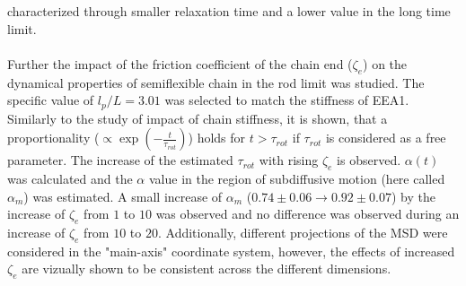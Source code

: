 \documentclass[
    paper=A4,pagesize=automedia,fontsize=12pt,
    BCOR=15mm,DIV=22,
    twoside,headinclude,footinclude=false,
    fleqn,             %
    bibliography=totocnumbered,          %
    listof=totoc,                %
    listof=flat,                 %
    cleardoublepage=empty      %
    numbers=endperiod
]{scrartcl}
\begin{document}
characterized through smaller relaxation time and a lower value in the long time limit.
\\
\\
Further the impact of the friction coefficient of the chain end ($\zeta_e$) 
on the dynamical properties of semiflexible chain in the rod limit was studied.
The specific value of $l_p/L=3.01$ was selected to match the stiffness of
EEA1. Similarly to the study of impact of chain stiffness, it is shown,
that a proportionality ($\propto \exp\left(-\frac{t}{\tau_{rot}}\right)$) holds
for $t>\tau_{rot}$ if $\tau_{rot}$ is considered as a free parameter.
The increase of the estimated $\tau_{rot}$ with rising $\zeta_e$ is observed.
$\alpha(t)$ was calculated and the $\alpha$ value in the region of subdiffusive motion
(here called $\alpha_m$) was estimated. A small
increase of $\alpha_m$
($0.74 \pm 0.06 \rightarrow 0.92 \pm 0.07$) by the 
increase of $\zeta_e$ from $1$ to $10$ was observed and no difference was observed
during an increase of $\zeta_e$ from $10$ to $20$. Additionally, different projections
of the MSD were considered in the "main-axis" coordinate system, however, the effects of 
increased $\zeta_e$ are vizually shown to be consistent across the different dimensions.
\end{document}
